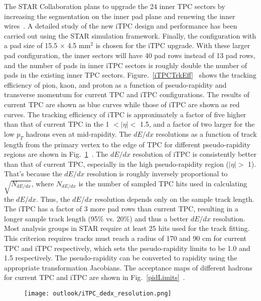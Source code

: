 The STAR Collaboration plans to upgrade the 24 inner TPC sectors by increasing the segmentation on the inner pad plane and renewing the inner wires~\cite{iTPC}. A detailed study of the new iTPC design and performance has been carried out using the STAR simulation framework. Finally, the configuration with a pad size of 15.5 $\times$ 4.5 mm$^{2}$ is chosen for the iTPC upgrade. With these larger pad configuration, the inner sectors will have 40 pad rows instead of 13 pad rows, and the number of pads in inner iTPC sectors is roughly double the number of pads in the existing inner TPC sectors. Figure.~\ref{iTPCTrkEff}~\cite{iTPC} shows the tracking efficiency of pion, kaon, and proton as a function of pseudo-rapidity and transverse momentum for current TPC and iTPC configurations. The results of current TPC are shown as blue curves while those of iTPC are shown as red curves. The tracking efficiency of iTPC is approximately a factor of five higher than that of current TPC in the 1 $<|\eta|<$ 1.5, and a factor of two larger for the low $p_{T}$ hadrons even at mid-rapidity. The $dE/dx$ resolutions as a function of track length from the primary vertex to the edge of TPC for different pseudo-rapidity regions are shown in Fig.~\ref{iTPCDedxRes}~\cite{iTPC}. The $dE/dx$ resolution of iTPC is consistently better than that of current TPC, especially in the high pseudo-rapidity region ($|\eta|>$ 1). That's because the $dE/dx$ resolution is roughly inversely proportional to $\sqrt{N_{dE/dx}}$, where $N_{dE/dx}$ is the number of sampled TPC hits used in calculating the $dE/dx$. Thus, the $dE/dx$ resolution depends only on the sample track length. The iTPC has a factor of 3 more pad rows than current TPC, resulting in a longer sample track length (95\% vs. 20\%) and thus a better $dE/dx$ resolution. Most analysis groups in STAR require at least 25 hits used for the track fitting. This criterion requires tracks must reach a radius of 170 and 90 cm for current TPC and iTPC respectively, which sets the pseudo-rapidity limits to be 1.0 and 1.5 respectively. The pseudo-rapidity can be converted to rapidity using the appropriate transformation Jacobians. The acceptance maps of different hadrons for current TPC and iTPC are shown in Fig.~\ref{pidLimits}~\cite{eTOFPhysics}.
 
 \begin{figure}[htbp]
\centering
\texttt{[image: outlook/iTPC\_dedx\_resolution.png]}
 \label{iTPCDedxRes}
\end{figure}

